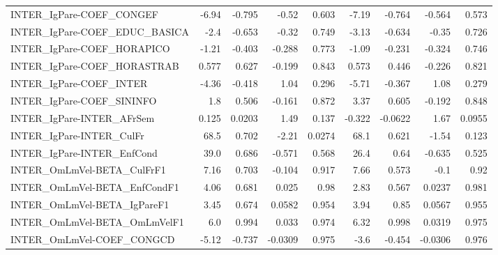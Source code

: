 \begin{tabular}{lrrrrrrrr}
INTER\_IgPare-COEF\_CONGEF              &       -6.94 &       -0.795 &   -0.52 &    0.603 &      -7.19 &      -0.764 &       -0.564 &         0.573 \\
INTER\_IgPare-COEF\_EDUC\_BASICA         &        -2.4 &       -0.653 &   -0.32 &    0.749 &      -3.13 &      -0.634 &        -0.35 &         0.726 \\
INTER\_IgPare-COEF\_HORAPICO            &       -1.21 &       -0.403 &  -0.288 &    0.773 &      -1.09 &      -0.231 &       -0.324 &         0.746 \\
INTER\_IgPare-COEF\_HORASTRAB           &       0.577 &        0.627 &  -0.199 &    0.843 &      0.573 &       0.446 &       -0.226 &         0.821 \\
INTER\_IgPare-COEF\_INTER               &       -4.36 &       -0.418 &    1.04 &    0.296 &      -5.71 &      -0.367 &         1.08 &         0.279 \\
INTER\_IgPare-COEF\_SININFO             &         1.8 &        0.506 &  -0.161 &    0.872 &       3.37 &       0.605 &       -0.192 &         0.848 \\
INTER\_IgPare-INTER\_AFrSem             &       0.125 &       0.0203 &    1.49 &    0.137 &     -0.322 &     -0.0622 &         1.67 &        0.0955 \\
INTER\_IgPare-INTER\_CulFr              &        68.5 &        0.702 &   -2.21 &   0.0274 &       68.1 &       0.621 &        -1.54 &         0.123 \\
INTER\_IgPare-INTER\_EnfCond            &        39.0 &        0.686 &  -0.571 &    0.568 &       26.4 &        0.64 &       -0.635 &         0.525 \\
INTER\_OmLmVel-BETA\_CulFrF1            &        7.16 &        0.703 &  -0.104 &    0.917 &       7.66 &       0.573 &         -0.1 &          0.92 \\
INTER\_OmLmVel-BETA\_EnfCondF1          &        4.06 &        0.681 &   0.025 &     0.98 &       2.83 &       0.567 &       0.0237 &         0.981 \\
INTER\_OmLmVel-BETA\_IgPareF1           &        3.45 &        0.674 &  0.0582 &    0.954 &       3.94 &        0.85 &       0.0567 &         0.955 \\
INTER\_OmLmVel-BETA\_OmLmVelF1          &         6.0 &        0.994 &   0.033 &    0.974 &       6.32 &       0.998 &       0.0319 &         0.975 \\
INTER\_OmLmVel-COEF\_CONGCD             &       -5.12 &       -0.737 & -0.0309 &    0.975 &       -3.6 &      -0.454 &      -0.0306 &         0.976 \\

\end{tabular}
